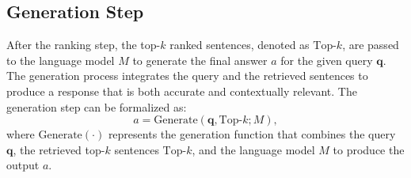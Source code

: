 


\subsection{Generation Step}
After the ranking step, the top-$k$ ranked sentences, denoted as $\text{Top-}k$, are passed to the language model $M$ to generate the final answer $a$ for the given query $\mathbf{q}$. The generation process integrates the query and the retrieved sentences to produce a response that is both accurate and contextually relevant. The generation step can be formalized as:
\[
a = \text{Generate}(\mathbf{q}, \text{Top-}k; M),
\]
where $\text{Generate}(\cdot)$ represents the generation function that combines the query $\mathbf{q}$, the retrieved top-$k$ sentences $\text{Top-}k$, and the language model $M$ to produce the output $a$.


